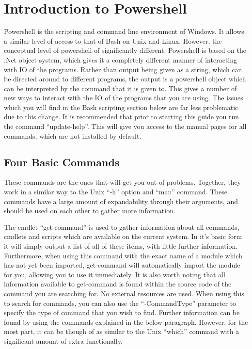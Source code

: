 \documentclass[a4paper,11pt]{report}
\begin{document}
	\section{Introduction to Powershell}
		Powershell is the scripting and command line environment of Windows.\cite{EffectivePS} 
		It allows a similar level of access to that of Bash on Unix and Linux. 
		However, the conceptual level of powershell of significantly different. 
		Powershell is based on the .Net object system, which gives it a completely different manner of interacting with IO of the programs. 
		Rather than output being given as a string, which can be directed around to different programs, the output is a powershell object which can be interpreted by the command that it is given to. 
		This gives a number of new ways to interact with the IO of the programs that you are using. 
		The issues which you will find in the Bash scripting section below are far less problematic due to this change. 
		It is recommended that prior to starting this guide you run the command ``update-help''. 
		This will give you access to the manual pages for all commands, which are not installed by default. 
		\subsection{Four Basic Commands}
			These commands are the ones that will get you out of problems. 
			Together, they work in a similar way to the Unix ``-h'' option and ``man'' command. 
			These commands have a large amount of expandability through their arguments, and should be used on each other to gather more information. 

			The cmdlet ``get-command'' is used to gather information about all commands, cmdlets and scripts which are available on the current system. 
			In it's basic form it will simply output a list of all of these items, with little further information.
			Furthermore, when using this command with the exact name of a module which has not yet been imported, get-command will automatically import the module for you, allowing you to use it immediately. 
			It is also worth noting that all information available to get-command is found within the source code of the command you are searching for. 
			No external resources are used.
			When using this to search for commands, you can also use the ``-CommandType'' parameter to specify the type of command that you wish to find. 
			Further information can be found by using the commands explained in the below paragraph. 
			However, for the most part, it can be though of as similar to the Unix ``which'' command with a significant amount of extra functionally. 
\end{document}
